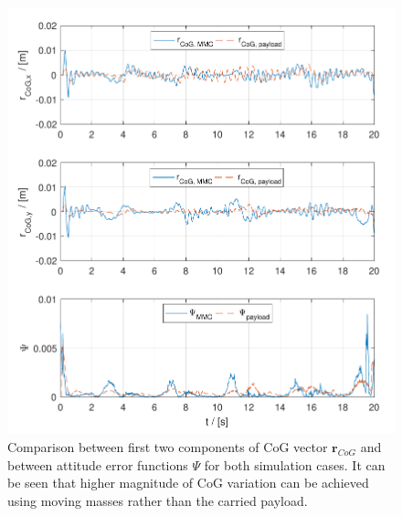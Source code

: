 \begin{figure}[h!]
	\centering
	\includegraphics[width=\columnwidth]{./pictures/both_cog_err.pdf}
	\caption{Comparison between first two components of CoG vector $\textbf{r}_{CoG}$ and between attitude error functions $\Psi$ for both simulation cases. It can be seen that higher magnitude of CoG variation can be achieved using moving masses rather than the carried payload.}
	\label{fig:cog_error}
\end{figure}

